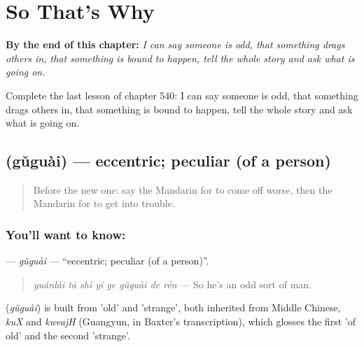 
\chapter{So That's Why}
\label{ch:zh-so-that-s-why}

\begin{chapteropening}
\textbf{By the end of this chapter:} \emph{I can say someone is odd, that something drags others in, that something is bound to happen, tell the whole story and ask what is going on.}

Complete the last lesson of chapter 540: I can say someone is odd, that something drags others in, that something is bound to happen, tell the whole story and ask what is going on.
\end{chapteropening}

\section[\texorpdfstring{\zh{古怪} (gǔguài)}{古怪 (gǔguài)}]{ (gǔguài) — eccentric; peculiar (of a person)}

\label{lesson:ZH-C540-guguai}



\begin{quote}
Before the new one: say the Mandarin for to come off worse, then the Mandarin for to get into trouble.
\end{quote}

\subsection*{You'll want to know: }
\textbf{} — \emph{gǔguài} — \textquotedblleft{}eccentric; peculiar (of a person)\textquotedblright{}.

\begin{quote}
\textbf{} \emph{yuánlái tā shì yí ge gǔguài de rén} — So he's an odd sort of man.
\end{quote}

\begin{cousinweb}
\textbf{} (\emph{gǔguài}) is built from  'old' and  'strange', both inherited from Middle Chinese, \emph{kuX} and \emph{kweajH} (Guangyun, in Baxter's transcription), which glosses the first 'of old' and the second 'strange'.
\end{cousinweb}

